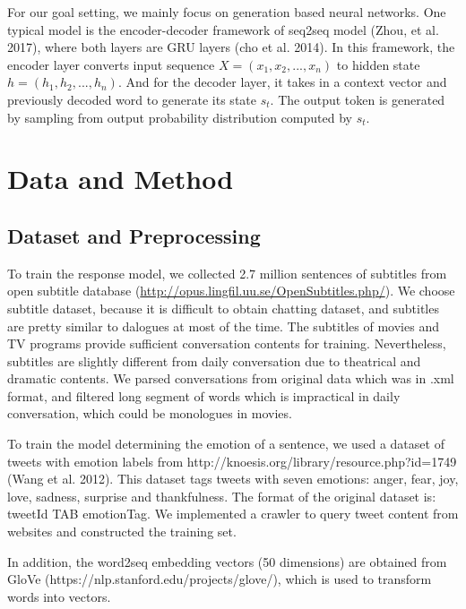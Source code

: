 \documentclass{article}
\begin{document}
For our goal setting, we mainly focus on generation based neural networks. One typical model is the encoder-decoder framework of seq2seq model (Zhou, et al. 2017), where both layers are GRU layers (cho et al. 2014). In this framework, the encoder layer converts input sequence $X = (x_1, x_2, ..., x_n)$ to hidden state $h = (h_1, h_2, ..., h_n)$. And for the decoder layer, it takes in a context vector and previously decoded word to generate its state $s_t$. The output token is generated by sampling from output probability distribution computed by $s_t$.




\section{Data and Method}

\subsection{Dataset and Preprocessing}

To train the response model, we collected 2.7 million sentences of subtitles from open subtitle database (\url{http://opus.lingfil.uu.se/OpenSubtitles.php/}). We choose subtitle dataset, because it is difficult to obtain chatting dataset, and subtitles are pretty similar to dalogues at most of the time. The subtitles of movies and TV programs provide sufficient conversation contents for training. Nevertheless, subtitles are slightly different from daily conversation due to theatrical and dramatic contents. We parsed conversations from original data which was in .xml format, and filtered long segment of words which is impractical in daily conversation, which could be monologues in movies. \par

To train the model determining the emotion of a sentence, we used a dataset of tweets with emotion labels from http://knoesis.org/library/resource.php?id=1749 (Wang et al. 2012). This dataset tags tweets with seven emotions: anger, fear, joy, love, sadness, surprise and thankfulness. The format of the original dataset is: tweetId TAB emotionTag. We implemented a crawler to query tweet content from websites and constructed the training set. \par 

In addition, the word2seq embedding vectors (50 dimensions) are obtained from GloVe (https://nlp.stanford.edu/projects/glove/), which is used to transform words into vectors. 
\end{document}
